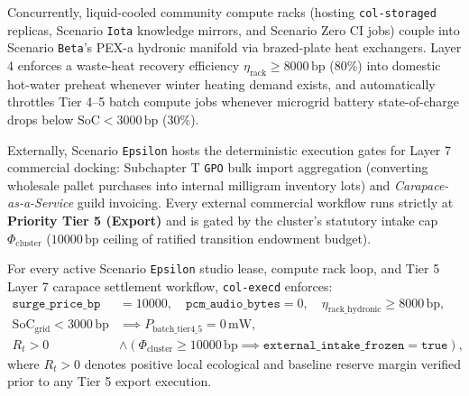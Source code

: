 Concurrently, liquid-cooled community compute racks (hosting \texttt{col-storaged} replicas, Scenario
\texttt{Iota} knowledge mirrors, and Scenario Zero CI jobs) couple into Scenario \texttt{Beta}'s PEX-a
hydronic manifold via brazed-plate heat exchangers. Layer 4 enforces a waste-heat recovery efficiency
$\eta_{\mathrm{rack}} \ge 8000\,\mathrm{bp}$ ($80\%$) into domestic hot-water preheat whenever winter
heating demand exists, and automatically throttles Tier 4--5 batch compute jobs whenever microgrid battery
state-of-charge drops below $\mathrm{SoC} < 3000\,\mathrm{bp}$ ($30\%$).

Externally, Scenario \texttt{Epsilon} hosts the deterministic execution gates for Layer 7 commercial
docking: Subchapter T \texttt{GPO} bulk import aggregation (converting wholesale pallet purchases into internal
milligram inventory lots) and \emph{Carapace-as-a-Service} guild invoicing. Every external commercial
workflow runs strictly at \textbf{Priority Tier 5 (Export)} and is gated by the cluster's statutory intake
cap $\Phi_{\mathrm{cluster}}$ ($10000\,\mathrm{bp}$ ceiling of ratified transition endowment budget).

\begin{invariant}
\label{inv:epsilon-gates}
For every active Scenario \texttt{Epsilon} studio lease, compute rack loop, and Tier 5 Layer 7 carapace
settlement workflow, \texttt{col-execd} enforces:
\begin{align}
\mathtt{surge\_price\_bp} &= 10000, \quad \mathtt{pcm\_audio\_bytes} = 0, \quad \eta_{\mathrm{rack\_hydronic}} \ge 8000\,\mathrm{bp}, \\
\mathrm{SoC}_{\mathrm{grid}} < 3000\,\mathrm{bp} &\implies P_{\mathrm{batch\_tier4\_5}} = 0\,\mathrm{mW}, \\
R_t > 0 &\land \left(\Phi_{\mathrm{cluster}} \ge 10000\,\mathrm{bp} \implies \mathtt{external\_intake\_frozen} = \mathtt{true}\right),
\end{align}
where $R_t > 0$ denotes positive local ecological and baseline reserve margin verified prior to any Tier 5
export execution.
\end{invariant}

